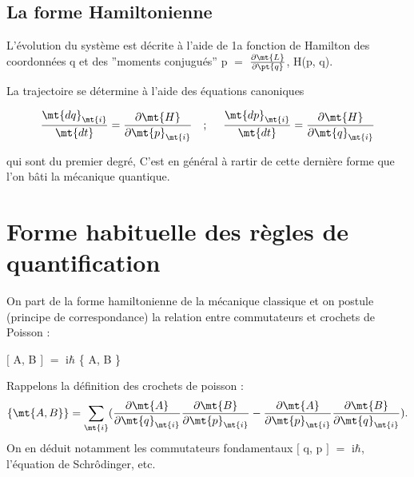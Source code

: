 \begin{center}  \end{center}

\subsection{La forme Hamiltonienne}
L'évolution du système est décrite à l'aide
de 1a fonction de Hamilton des coordonnées q et des ''moments conjugués''
p $=$ $\frac{\partial \mt{L}}{\partial \pt{q}}$, H(p, q).

La trajectoire se détermine à l'aide des équations canoniques

\[
\frac{\mt{dq}_\mt{i}}{\mt{dt}} = \frac{\partial \mt{H}}{\partial \mt{p}_\mt{i}}
\ \ \ ;\ \ \ \ 
\frac{\mt{dp}_\mt{i}}{\mt{dt}} = \frac{\partial \mt{H}}{\partial \mt{q}_\mt{i}}
\]

qui sont du premier degré,
C'est en général à rartir de cette dernière forme que l'on bâti
la mécanique quantique.
\section{Forme habituelle des règles de quantification}

On part de la forme hamiltonienne de la mécanique classique
et on postule (principe de correspondance) la relation entre commutateurs
et crochets de Poisson :

\begin{center}
$[$ A, B $]$ $=$ i$\hbar$ \{ A, B \}
\end{center}

Rappelons la définition des crochets de poisson :
\[
\{\mt{ A, B }\} = \sum_\mt{i}
(\frac{\partial \mt{A}}{\partial \mt{q}_\mt{i}}\frac{\partial \mt{B}}{\partial \mt{p}_\mt{i}}
- \frac{\partial \mt{A}}{\partial \mt{p}_\mt{i}}\frac{\partial \mt{B}}{\partial \mt{q}_\mt{i}}).
\]
On en déduit notamment les commutateurs fondamentaux $[$ q, p $]$ $=$ i$\hbar$,
l'équation de Schrôdinger, etc.

